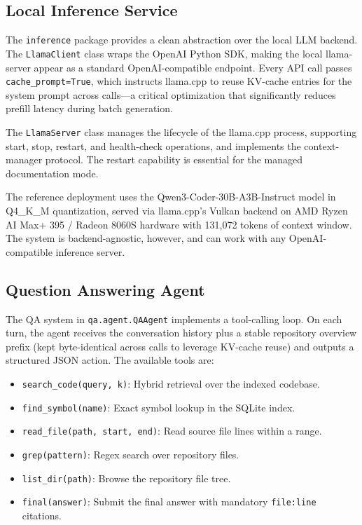 \documentclass[10pt,twocolumn]{article}
\begin{document}
\subsection{Local Inference Service}

The \texttt{inference} package provides a clean abstraction over the local LLM backend. The \texttt{LlamaClient} class wraps the OpenAI Python SDK, making the local llama-server appear as a standard OpenAI-compatible endpoint. Every API call passes \texttt{cache\_prompt=True}, which instructs llama.cpp to reuse KV-cache entries for the system prompt across calls---a critical optimization that significantly reduces prefill latency during batch generation.

The \texttt{LlamaServer} class manages the lifecycle of the llama.cpp process, supporting start, stop, restart, and health-check operations, and implements the context-manager protocol. The restart capability is essential for the managed documentation mode.

The reference deployment uses the Qwen3-Coder-30B-A3B-Instruct model in Q4\_K\_M quantization, served via llama.cpp's Vulkan backend on AMD Ryzen AI Max+ 395 / Radeon 8060S hardware with 131,072 tokens of context window. The system is backend-agnostic, however, and can work with any OpenAI-compatible inference server.

\subsection{Question Answering Agent}

The QA system in \texttt{qa.agent.QAAgent} implements a tool-calling loop. On each turn, the agent receives the conversation history plus a stable repository overview prefix (kept byte-identical across calls to leverage KV-cache reuse) and outputs a structured JSON action. The available tools are:

\begin{itemize}[nosep,leftmargin=*]
  \item \texttt{search\_code(query, k)}: Hybrid retrieval over the indexed codebase.
  \item \texttt{find\_symbol(name)}: Exact symbol lookup in the SQLite index.
  \item \texttt{read\_file(path, start, end)}: Read source file lines within a range.
  \item \texttt{grep(pattern)}: Regex search over repository files.
  \item \texttt{list\_dir(path)}: Browse the repository file tree.
  \item \texttt{final(answer)}: Submit the final answer with mandatory \texttt{file:line} citations.
\end{itemize}
\end{document}
